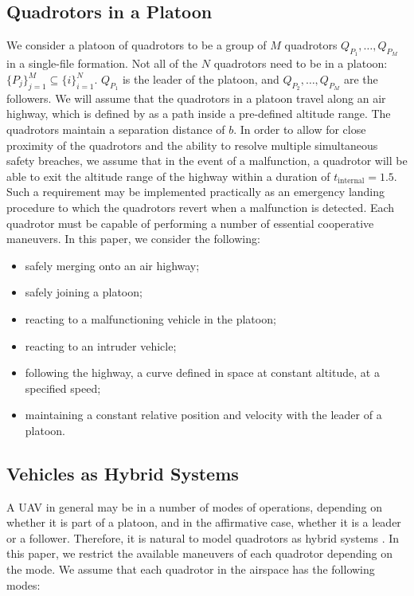 \subsection{Quadrotors in a Platoon\label{subsec:platoon_def}}
We consider a platoon of quadrotors to be a group of $M$ quadrotors $Q_{P_1}, \ldots, Q_{P_M}$ in a single-file formation. Not all of the $N$ quadrotors need to be in a platoon: $\{P_j\}_{j=1}^M \subseteq \{i\}_{i=1}^N$. $Q_{P_1}$ is the leader of the platoon, and $Q_{P_2},\ldots,Q_{P_M}$ are the followers. We will assume that the quadrotors in a platoon travel along an air highway, which is defined by as a path inside a pre-defined altitude range. The quadrotors maintain a separation distance of $b$. In order to allow for close proximity of the quadrotors and the ability to resolve multiple simultaneous safety breaches, we assume that in the event of a malfunction, a quadrotor will be able to exit the altitude range of the highway within a duration of $t_\text{internal}=1.5$. Such a requirement may be implemented practically as an emergency landing procedure to which the quadrotors revert when a malfunction is detected. Each quadrotor must be capable of performing a number of essential cooperative maneuvers. In this paper, we consider the following: 
\begin{itemize}
\item safely merging onto an air highway;
\item safely joining a platoon;
\item reacting to a malfunctioning vehicle in the platoon;
\item reacting to an intruder vehicle;
\item following the highway, a curve defined in space at constant altitude, at a specified speed;
\item maintaining a constant relative position and velocity with the leader of a platoon.
\end{itemize}

\subsection{Vehicles as Hybrid Systems}
A UAV in general may be in a number of modes of operations, depending on whether it is part of a platoon, and in the affirmative case, whether it is a leader or a follower. Therefore, it is natural to model quadrotors as hybrid systems \cite{Lygeros98,Lygeros12}. In this paper, we restrict the available maneuvers of each quadrotor depending on the mode. We assume that each quadrotor in the airspace has the following modes:

